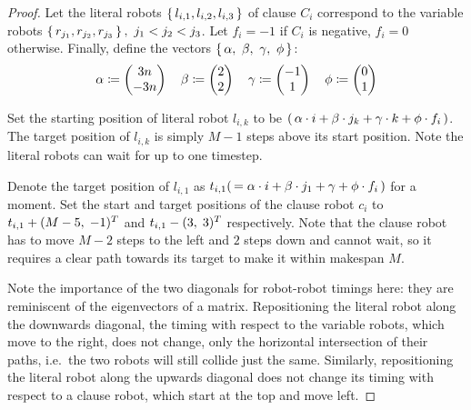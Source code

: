 \begin{proof}

	Let the literal robots \(\set{l_{i,1}, l_{i,2}, l_{i,3}}\) of clause \(C_i\) correspond to the variable robots \(\set{r_{j_1}, r_{j_2}, r_{j_3}},\ j_1 < j_2 < j_3\). 
	Let \(f_i = -1\) if \(C_i\) is negative, \(f_i = 0\) otherwise. 
	Finally, define the vectors \(\set{\alpha,\ \beta,\ \gamma,\ \phi}\):
	\begin{align*}
	\alpha \coloneqq \begin{pmatrix} 3n \\ -3n \end{pmatrix} \quad 
	\beta \coloneqq \begin{pmatrix} 2 \\ 2 \end{pmatrix} \quad 
	\gamma \coloneqq \begin{pmatrix} -1 \\ 1 \end{pmatrix} \quad 
	\phi \coloneqq \begin{pmatrix} 0 \\ 1 \end{pmatrix}
	\end{align*}

	Set the starting position of literal robot \(l_{i,k}\) to be \((\, \alpha \cdot i + \beta \cdot j_k + \gamma \cdot k + \phi \cdot f_i \,)\). 
	The target position of \(l_{i,k}\) is simply \(M - 1\) steps above its start position. 
	Note the literal robots can wait for up to one timestep.


	Denote the target position of \(l_{i,1}\) as \(t_{i,1} (\, = \alpha \cdot i + \beta \cdot j_1 + \gamma + \phi \cdot f_i \,)\) for a moment. 
	Set the start and target positions of the clause robot \(c_i\) to \(t_{i,1} + (M - 5, \; -1)^T\) and \(t_{i,1} - (3, \; 3)^T\) respectively. 
	Note that the clause robot has to move \(M - 2\) steps to the left and \(2\) steps down and cannot wait, so it requires a clear path towards its target to make it within makespan \(M\).
	
	Note the importance of the two diagonals for robot-robot timings here: they are reminiscent of the eigenvectors of a matrix. 
	Repositioning the literal robot along the downwards \diagdegs diagonal, the timing with respect to the variable robots, which move to the right, does not change, only the horizontal intersection of their paths, i.e.~the two robots will still collide just the same. 
	Similarly, repositioning the literal robot along the upwards diagonal does not change its timing with respect to a clause robot, which start at the top and move left. 


\end{proof}
